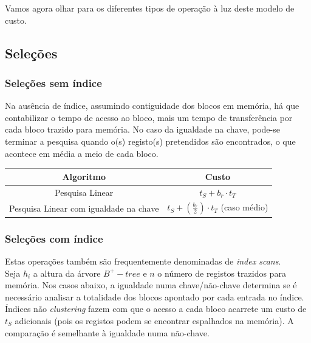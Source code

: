 \documentclass[oneside]{book}
\theoremstyle{definition}
\begin{document}
Vamos agora olhar para os diferentes tipos de operação à luz deste modelo de custo.

\subsection{Seleções}

\subsubsection*{Seleções sem índice}

Na ausência de índice, assumindo contiguidade dos blocos em memória, há que contabilizar o tempo de acesso ao bloco, mais um tempo de transferência por cada bloco trazido para memória. No caso da igualdade na chave, pode-se terminar a pesquisa quando o(s) registo(s) pretendidos são encontrados, o que acontece em média a meio de cada bloco.

\begin{table}[H]
    \centering
    \begin{tabular}{c|c}
       Algoritmo                              & Custo  \\ \hline
      Pesquisa Linear                        &   $t_S + b_r \cdot t_T$     \\ \hline
     Pesquisa Linear com igualdade na chave &     $t_S + (\frac{b_r}{2}) \cdot t_T$ (caso médio)  \\ \hline
    \end{tabular}
\end{table}

\subsubsection*{Seleções com índice}

Estas operações também são frequentemente denominadas de \textit{index scans}. \\
Seja $h_i$ a altura da árvore $B^{+}-tree$ e $n$ o número de registos trazidos para memória. Nos casos abaixo, a igualdade numa chave/não-chave determina se é necessário analisar a totalidade dos blocos apontado por cada entrada no índice. Índices não \textit{clustering} fazem com que o acesso a cada bloco acarrete um custo de $t_S$ adicionais (pois os registos podem se encontrar espalhados na memória). A comparação é semelhante à igualdade numa não-chave.
\end{document}
